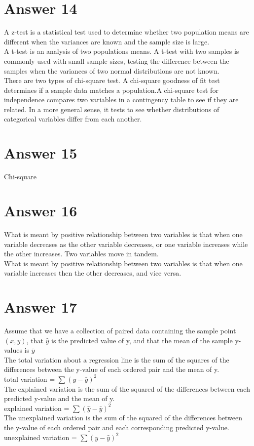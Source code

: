 \documentclass[12pt]{article}
\begin{document}
\section*{Answer 14}
A z-test is a statistical test used to determine whether two population means are different when the variances are known and the sample size is large. \\
A t-test is an analysis of two populations means. A t-test with two samples is commonly used with small sample sizes, testing the difference between the samples when the variances of two normal distributions are not known. \\
There are two types of chi-square test. A chi-square goodness of fit test determines if a sample data matches a population.A chi-square test for independence compares two variables in a contingency table to see if they are related. In a more general sense, it tests to see whether distributions of categorical variables differ from each another.\\
\section*{Answer 15}
Chi-square \\
\section*{Answer 16}

What is meant by positive relationship between two variables is that when one variable decreases as the other variable decreases, or one variable increases while the other increases. Two variables move in tandem. \\

What is meant by positive relationship between two variables is that when one variable increases then the other decreases, and vice versa. \\

\section*{Answer 17}
Assume that we have a collection of paired data containing the sample point $(x , y)$, that $\hat y$ is the predicted value of y, and that the mean of the sample y-values is $\bar y$ \\
The total variation about a regression line is the sum of the squares of the differences between the y-value of each ordered pair and the mean of y. \\
total variation = $\sum {(y - \bar{y})}^2 $ \\
The explained variation is the sum of the squared of the differences between each predicted y-value and the mean of y. \\
explained variation = $\sum {(\hat{y} - \bar{y})}^2 $ \\
The unexplained variation is the sum of the squared of the differences between the y-value of each ordered pair and each corresponding predicted y-value. \\
unexplained variation = $\sum {(y - \hat{y})}^2 $ \\
\end{document}
